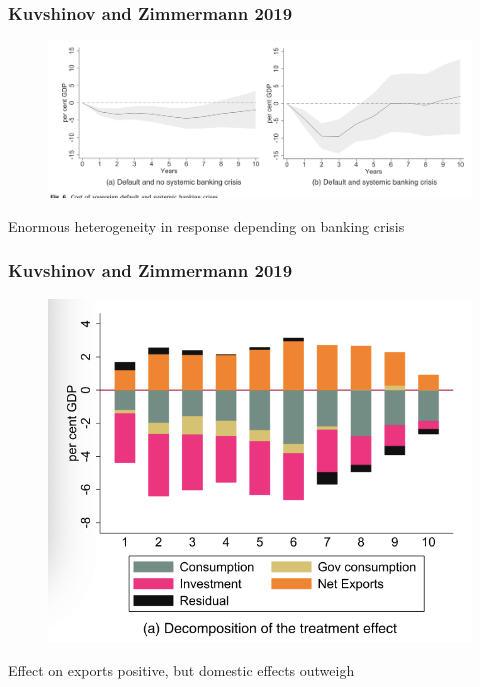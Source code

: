 \documentclass{beamer}
\begin{document}
\begin{frame}
\frametitle{Kuvshinov and  Zimmermann 2019}
\begin{figure}
\centering
\includegraphics[scale=0.5]{Kuvshinov_4.png}
\end{figure}
Enormous heterogeneity in response depending on banking crisis
\end{frame}

\begin{frame}
\frametitle{Kuvshinov and  Zimmermann 2019}
\begin{figure}
\centering
\includegraphics[scale=0.7]{Kuvshinov_5.png}
\end{figure}
Effect on exports positive, but domestic effects outweigh
\end{frame}
\end{document}
